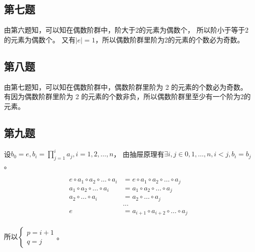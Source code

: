 \documentclass[12pt,onecolumn]{article}
\theoremstyle{plain}
\begin{document}
\subsection{第七题}
\begin{proof*}
  由第六题知，可以知在偶数阶群中，阶大于2的元素为偶数个，
  所以阶小于等于2的元素为偶数个。
  又有$|e| = 1$，所以偶数阶群里阶为2的元素的个数必为奇数。
\end{proof*}

\subsection{第八题}
\begin{proof*}
  由第七题知，可以知在偶数阶群中，偶数阶群里阶为 2 的元素的个数必为奇数。
  有因为偶数阶群里阶为 2 的元素的个数非负，所以偶数阶群里至少有一个阶为2的元素。
\end{proof*}

\subsection{第九题}
\begin{proof*}
  设$b_0 = e, b_i = \prod_{j=1}^{i}a_j, i = 1, 2, \ldots, n$，
  由抽屉原理有$\exists i, j \in {0, 1, \ldots, n}, i < j, b_i = b_j$。

  \begin{align*}
    e \circ a_1 \circ a_2 \circ \ldots \circ a_i &= e \circ a_1 \circ a_2 \circ \ldots \circ a_j \\
    a_1 \circ a_2 \circ \ldots \circ a_i &= a_1 \circ a_2 \circ \ldots \circ a_j \\
    a_2 \circ \ldots \circ a_i &= a_2 \circ \ldots \circ a_j \\
                            &\cdots \\
    e &= a_{i + 1} \circ a_{i + 2} \circ \ldots \circ a_j \\
  \end{align*}

  所以$ \left\{
    \begin{array}{l}
      p = i + 1 \\
      q = j
    \end{array} \right.$。
\end{proof*}
\end{document}
